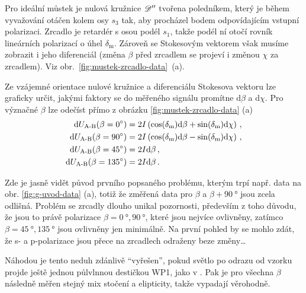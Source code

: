 Pro ideální můstek je nulová kružnice $\mathscr{D}''$ tvořena poledníkem, který je během vyvažování otáčen kolem osy $s_3$ tak, aby procházel bodem odpovídajícím vstupní polarizaci.
Zrcadlo je retardér s osou podél $s_1$, takže podél ní otočí rovník lineárních polarizací o úhel $\delta_\textrm{m}$.
Zároveň se Stokesovým vektorem však musíme zobrazit i jeho diferenciál (změna $\beta$ před zrcadlem se projeví i změnou $\chi$ za zrcadlem).
Viz obr.~\ref{fig:mustek-zrcadlo-data}~(a).

Ze vzájemné orientace nulové kružnice a diferenciálu Stokesova vektoru lze graficky určit, jakými faktory se do měřeného signálu promítne $\textrm{d}\beta$ a $\textrm{d}\chi$.
Pro význačné $\beta$ lze odečíst přímo z obrázku \ref{fig:mustek-zrcadlo-data} (a)
\begin{align}
    \textrm{d}U_\textrm{A-B}(\beta=\SI{0}{\degree}) &= 2I\left(\cos(\delta_\textrm{m})\textrm{d}\beta + \sin(\delta_\textrm{m})\textrm{d}\chi\right) \,,\\
    \textrm{d}U_\textrm{A-B}(\beta=\SI{90}{\degree}) &= 2I\left(\cos(\delta_\textrm{m})\textrm{d}\beta - \sin(\delta_\textrm{m})\textrm{d}\chi\right) \,,\\
    \textrm{d}U_\textrm{A-B}(\beta=\SI{45}{\degree}) &= 2I\textrm{d}\beta \,, \label{eqn:must-zrc-1}\\
    \textrm{d}U_\textrm{A-B}(\beta=\SI{135}{\degree}) &= 2I\textrm{d}\beta \,. \label{eqn:must-zrc-2}
\end{align}

Zde je jasně vidět původ prvního popsaného problému, kterým trpí např. data na obr. \ref{fig:g-uvod-data} (a), totiž že změřená data pro $\beta$ a $\beta+\SI{90}{\degree}$ jsou zcela odlišná.
Problém se zrcadly dlouho unikal pozornosti, především z toho důvodu, že jsou to právě polarizace $\beta=\SI{0}{\degree}, \SI{90}{\degree}$, které jsou nejvíce ovlivněny, zatímco $\beta=\SI{45}{\degree}, \SI{135}{\degree}$ jsou ovlivněny jen minimálně.
Na první pohled by se mohlo zdát, že s- a p-polarizace jsou přece na zrcadlech odraženy beze změny\ldots

Náhodou je tento neduh zdánlivě ``vyřešen'', pokud světlo po odrazu od vzorku projde ještě jednou půlvlnnou destičkou WP1, jako v \cite{wohlrathMagnetooptickaCharakterizaceSpintronickych2018,kubascikMagnetooptickeStudiumAntiferomagnetickych2019,kimakOptickaSpektroskopieAntiferomagnetu2019}.
Pak je pro všechna $\beta$ následně měřen stejný mix stočení a elipticity, takže vypadají věrohodně.

